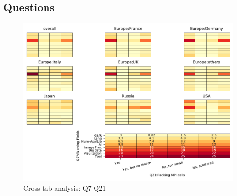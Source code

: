 
\subsection{Questions}


\begin{figure}
\begin{center}
\includegraphics[width=12cm]{../pdfs/Q7-Q21.pdf}
\caption{Cross-tab analysis: Q7-Q21}
\label{fig:Q7-Q21}
\end{center}
\end{figure}
